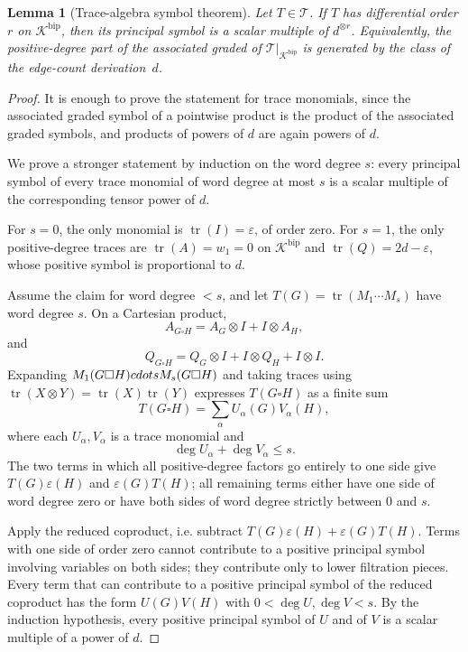 \documentclass[11pt]{amsart}
\newcommand{\K}{\mathcal{K}}
\newcommand{\cT}{\mathcal{T}}
\newcommand{\tr}{\operatorname{tr}}
\newtheorem{lemma}[theorem]{Lemma}
\theoremstyle{definition}
\theoremstyle{remark}
\begin{document}
\begin{lemma}[Trace-algebra symbol theorem]\label{lem:trace-symbol}
Let $T\in\cT$. If $T$ has differential order $r$ on $\K^{\mathrm{bip}}$, then its principal symbol is a scalar multiple of $d^{\otimes r}$. Equivalently, the positive-degree part of the associated graded of $\cT|_{\K^{\mathrm{bip}}}$ is generated by the class of the edge-count derivation~$d$.
\end{lemma}

\begin{proof}
It is enough to prove the statement for trace monomials, since the associated graded symbol of a pointwise product is the product of the associated graded symbols, and products of powers of $d$ are again powers of $d$.

We prove a stronger statement by induction on the word degree $s$: every principal symbol of every trace monomial of word degree at most $s$ is a scalar multiple of the corresponding tensor power of $d$.

For $s=0$, the only monomial is $\tr(I)=\varepsilon$, of order zero. For $s=1$, the only positive-degree traces are $\tr(A)=w_1=0$ on $\K^{\mathrm{bip}}$ and $\tr(Q)=2d-\varepsilon$, whose positive symbol is proportional to $d$.

Assume the claim for word degree $<s$, and let $T(G)=\tr(M_1\cdots M_s)$ have word degree $s$. On a Cartesian product,
\[
   A_{G\square H}=A_G\otimes I+I\otimes A_H,
\]
and
\[
   Q_{G\square H}=Q_G\otimes I+I\otimes Q_H+I\otimes I.
\]
Expanding $M_1(G\square H)\\cdots M_s(G\square H)$ and taking traces using $\tr(X\otimes Y)=\tr(X)\tr(Y)$ expresses $T(G\square H)$ as a finite sum
\begin{equation}\label{eq:trace-coproduct}
   T(G\square H)=\sum_\alpha U_\alpha(G)V_\alpha(H),
\end{equation}
where each $U_\alpha,V_\alpha$ is a trace monomial and
\[
   \deg U_\alpha+\deg V_\alpha\le s.
\]
The two terms in which all positive-degree factors go entirely to one side give $T(G)\varepsilon(H)$ and $\varepsilon(G)T(H)$; all remaining terms either have one side of word degree zero or have both sides of word degree strictly between $0$ and $s$.

Apply the reduced coproduct, i.e. subtract $T(G)\varepsilon(H)+\varepsilon(G)T(H)$. Terms with one side of order zero cannot contribute to a positive principal symbol involving variables on both sides; they contribute only to lower filtration pieces. Every term that can contribute to a positive principal symbol of the reduced coproduct has the form $U(G)V(H)$ with $0<\deg U,\deg V<s$. By the induction hypothesis, every positive principal symbol of $U$ and of $V$ is a scalar multiple of a power of $d$.


\end{proof}
\end{document}
